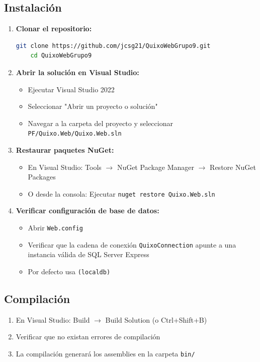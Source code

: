 \documentclass[12pt]{article}
\begin{document}
\subsection*{Instalación}
\begin{enumerate}
    \item \textbf{Clonar el repositorio:}
    \begin{lstlisting}[language=bash]
    git clone https://github.com/jcsg21/QuixoWebGrupo9.git
    cd QuixoWebGrupo9
    \end{lstlisting}

    \item \textbf{Abrir la solución en Visual Studio:}
    \begin{itemize}
        \item Ejecutar Visual Studio 2022
        \item Seleccionar "Abrir un proyecto o solución"
        \item Navegar a la carpeta del proyecto y seleccionar \texttt{PF/Quixo.Web/Quixo.Web.sln}
    \end{itemize}

    \item \textbf{Restaurar paquetes NuGet:}
    \begin{itemize}
        \item En Visual Studio: Tools $\rightarrow$ NuGet Package Manager $\rightarrow$ Restore NuGet Packages
        \item O desde la consola: Ejecutar \texttt{nuget restore Quixo.Web.sln}
    \end{itemize}

    \item \textbf{Verificar configuración de base de datos:}
    \begin{itemize}
        \item Abrir \texttt{Web.config}
        \item Verificar que la cadena de conexión \texttt{QuixoConnection} apunte a una instancia válida de SQL Server Express
        \item Por defecto usa \texttt{(localdb)\MSSQLLocalDB}
    \end{itemize}
\end{enumerate}

\subsection*{Compilación}
\begin{enumerate}
    \item En Visual Studio: Build $\rightarrow$ Build Solution (o Ctrl+Shift+B)
    \item Verificar que no existan errores de compilación
    \item La compilación generará los assemblies en la carpeta \texttt{bin/}
\end{enumerate}
\end{document}
